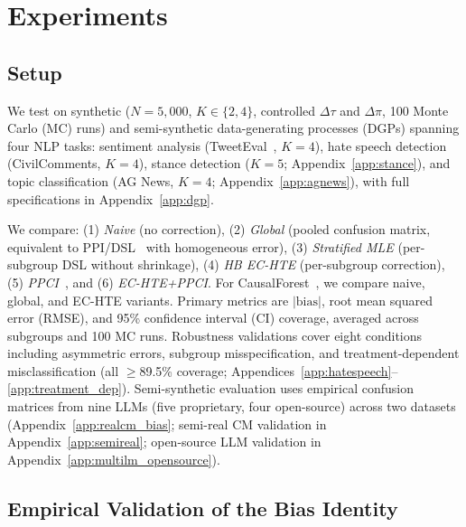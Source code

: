 \section{Experiments}

\subsection{Setup}

We test on synthetic ($N{=}5{,}000$, $K \in \{2, 4\}$, controlled $\Delta\tau$ and $\Delta\pi$, 100 Monte Carlo (MC) runs) and semi-synthetic data-generating processes (DGPs) spanning four NLP tasks: sentiment analysis (TweetEval~\cite{barbieri2020tweeteval}, $K{=}4$), hate speech detection (CivilComments, $K{=}4$), stance detection ($K{=}5$; Appendix~\ref{app:stance}), and topic classification (AG News, $K{=}4$; Appendix~\ref{app:agnews}), with full specifications in Appendix~\ref{app:dgp}.

We compare: (1) \textit{Naive} (no correction), (2) \textit{Global} (pooled confusion matrix, equivalent to PPI/DSL~\cite{angelopoulos2023ppi,egami2023dsl} with homogeneous error), (3) \textit{Stratified MLE} (per-subgroup DSL without shrinkage), (4) \textit{HB EC-HTE} (per-subgroup correction), (5) \textit{PPCI}~\cite{sui2026ppci}, and (6) \textit{EC-HTE+PPCI}.
For CausalForest~\cite{wager2018causal}, we compare naive, global, and EC-HTE variants.
Primary metrics are $|\text{bias}|$, root mean squared error (RMSE), and 95\% confidence interval (CI) coverage, averaged across subgroups and 100 MC runs.
Robustness validations cover eight conditions including asymmetric errors, subgroup misspecification, and treatment-dependent misclassification (all $\geq$89.5\% coverage; Appendices~\ref{app:hatespeech}--\ref{app:treatment_dep}).
Semi-synthetic evaluation uses empirical confusion matrices from nine LLMs (five proprietary, four open-source) across two datasets (Appendix~\ref{app:realcm_bias}; semi-real CM validation in Appendix~\ref{app:semireal}; open-source LLM validation in Appendix~\ref{app:multilm_opensource}).

\subsection{Empirical Validation of the Bias Identity}
\label{sec:bias_mechanism}

